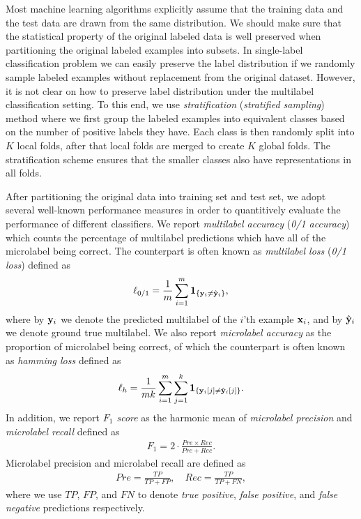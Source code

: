 {Most machine learning algorithms explicitly assume that the training data and the test data are drawn from the same distribution.
We should make sure that the statistical property of the original labeled data is well preserved when partitioning the original labeled examples into subsets.
In single-label classification problem we can easily preserve the label distribution if we randomly sample labeled examples without replacement from the original dataset.
However, it is not clear on how to preserve label distribution under the multilabel classification setting.
To this end, we use \textit{stratification} (\textit{stratified sampling}) method where we first group the labeled examples into equivalent classes based on the number of positive labels they have. 
Each class is then randomly split into $K$ local folds, after that local folds are merged to create $K$ global folds.
The stratification scheme ensures that the smaller classes also have representations in all folds. 

After partitioning the original data into training set and test set, we adopt several well-known performance measures in order to quantitively evaluate the performance of different classifiers.
We report \textit{multilabel accuracy} (\textit{0/1 accuracy}) which counts the percentage of multilabel predictions which have all of the microlabel being correct.
The counterpart is often known as \textit{multilabel loss} (\textit{0/1 loss}) defined as
\begin{align*}
	\ell_{0/1} = \frac{1}{m}\sum_{i=1}^{m}\mathbf{1}_{\{\mathbf {y}_i \neq \hat{\mathbf {y}}_i\}},
\end{align*}
where by $\mathbf {y}_i$ we denote the predicted multilabel of the $i$'th example $\mathbf {x}_i$, and by $\hat{\mathbf {y}}_i$ we denote ground true multilabel.
We also report \textit{microlabel accuracy} as the proportion of microlabel being correct, of which the counterpart is often known as \textit{hamming loss} defined as
\begin{align*}
	\ell_{h} = \frac{1}{mk}\sum_{i=1}^{m}\sum_{j=1}^{k}\mathbf{1}_{\{\mathbf {y}_i[j] \neq \hat{\mathbf {y}}_i[j]\}}.
\end{align*}
In addition, we report \textit{$F_1$ score} as the harmonic mean of \textit{microlabel precision} and \textit{microlabel recall} defined as
\begin{align*}
	F_1 = 2\cdot\frac{Pre\times Rec}{Pre+Rec}.
\end{align*}
Microlabel precision and microlabel recall are defined as
\begin{align*}
	Pre = \frac{TP}{TP+FP}, \quad Rec = \frac{TP}{TP+FN},
\end{align*}
where we use $TP$, $FP$, and $FN$ to denote \textit{true positive}, \textit{false positive}, and \textit{false negative} predictions respectively.


}

